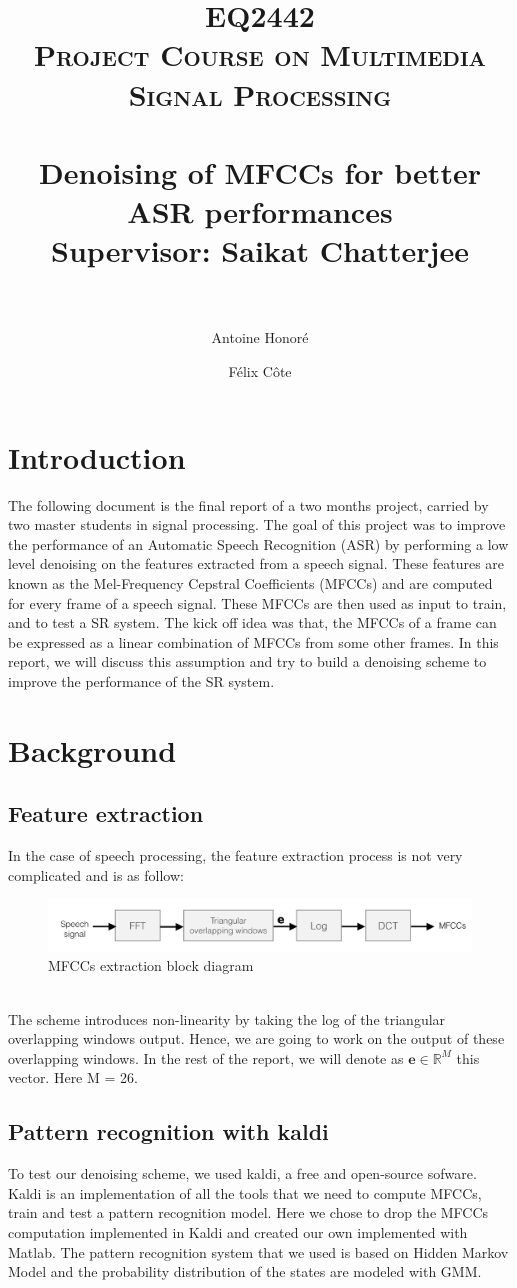 \documentclass[a4paper]{report}
\title{	 
\textsc{EQ2442\\Project Course on Multimedia Signal Processing}\\[25pt] 
\horrule{1pt} \\[0.4cm] %
\huge {Denoising of MFCCs for better ASR performances} \\[0.4 cm] %
\Large{Supervisor: Saikat Chatterjee}\\[0.4 cm]
\horrule{2pt} \\[0.2cm] %
}
\author{ Antoine Honoré\\ \email{honore@kth.se} \and Félix Côte\\\email{fcote@kth.se} }
\begin{document}
\maketitle
\tableofcontents
\section*{Introduction}
The following document is the final report of a two months project, carried by two master students in signal processing. The goal of this project was to improve the performance of an Automatic Speech Recognition (ASR) by performing a low level denoising on the features extracted from  a speech signal. These features are known as the Mel-Frequency Cepstral Coefficients (MFCCs) and are computed for every frame of a speech signal. These MFCCs are then used as input to train, and to test a SR system. The kick off idea was that, the MFCCs of a frame can be expressed as a linear combination of MFCCs from some other frames. In this report, we will discuss this assumption and try to build a denoising scheme to improve the performance of the SR system.
\section{Background}
\subsection{Feature extraction}
In the case of speech processing, the feature extraction process is not very complicated and is as follow:
\begin{figure}[!ht]
\centering
\includegraphics[scale= .3]{feature_extraction}
\caption{MFCCs extraction block diagram}
\label{feature_extraction}

\end{figure}\\
The scheme introduces non-linearity by taking the log of the triangular overlapping windows output. Hence, we are going to work on the output of these overlapping windows. In the rest of the report, we will denote as $\textbf{e} \in \mathbb{R}^M$ this vector. Here M = 26.

\subsection{Pattern recognition with kaldi}
To test our denoising scheme, we used kaldi, a free and open-source sofware. Kaldi is an implementation of all the tools that we need to compute MFCCs, train and test a pattern recognition model. Here we chose to drop the MFCCs computation implemented in Kaldi and created our own implemented with Matlab. The pattern recognition system that we used is based on Hidden Markov Model and the probability distribution of the states are modeled with GMM.
\end{document}
